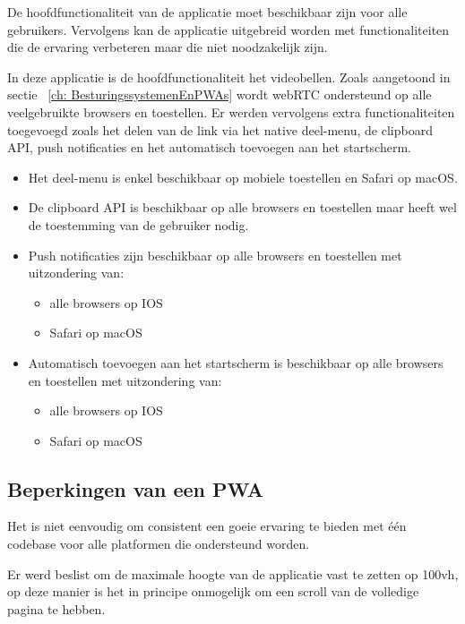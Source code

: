 		De hoofdfunctionaliteit van de applicatie moet beschikbaar zijn voor alle gebruikers. Vervolgens kan de applicatie uitgebreid worden met functionaliteiten die de ervaring verbeteren maar die niet noodzakelijk zijn.
		
		In deze applicatie is de hoofdfunctionaliteit het videobellen. Zoals aangetoond in sectie ~\ref{ch: BesturingssystemenEnPWAs} wordt webRTC ondersteund op alle veelgebruikte browsers en toestellen.  Er werden vervolgens extra functionaliteiten toegevoegd zoals het delen van de link via het native deel-menu, de clipboard API, push notificaties en het automatisch toevoegen aan het startscherm.
		\begin{itemize}
	  		\item Het deel-menu is enkel beschikbaar op mobiele toestellen en Safari op macOS.
	  		\item De clipboard API is beschikbaar op alle browsers en toestellen maar heeft wel de toestemming van de gebruiker nodig.
	  		\item Push notificaties zijn beschikbaar op alle browsers en toestellen met uitzondering van:
	  				\begin{itemize}
	  			  		\item alle browsers op IOS
	  			  		\item Safari op macOS
	  		 		\end{itemize}	
  			\item Automatisch toevoegen aan het startscherm is beschikbaar op alle browsers en toestellen met uitzondering van:
	  				\begin{itemize}
	  			  		\item alle browsers op IOS
	  			  		\item Safari op macOS
	  		 		\end{itemize}	
 		\end{itemize}
 		
 	
 	\subsection{Beperkingen van een PWA}
 			
			Het is niet eenvoudig om consistent een goeie ervaring te bieden met één codebase voor alle platformen die ondersteund worden. 
			
			Er werd beslist om de maximale hoogte van de applicatie vast te zetten op 100vh,  op deze manier is het in principe onmogelijk om een scroll van de volledige pagina te hebben. 
			
